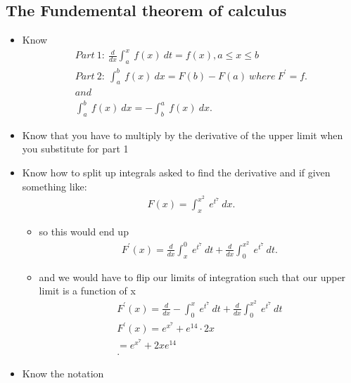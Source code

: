 \documentclass{report}
\begin{document}
      \subsection{The Fundemental theorem of calculus}
      \begin{itemize}
        \item Know
          \begin{align*}
            Part\ 1:\ \frac{d}{dx}\int_{a}^{x}\ f(x)\ dt  = f(x), a \leq x \leq b         \\
            Part\ 2:\ \int_{a}^{b}\ f(x)\ dx = F(b) - F(a)\ where\ F^{\prime} = f. \\
            and \\
            \int_{a}^{b}\ f(x)\ dx = -\int_{b}^{a}\ f(x)\ dx
        .\end{align*}
        \smallbreak \noindent
        \item Know that you have to multiply by the derivative of the upper limit when you substitute for part 1
        \item Know how to split up integrals asked to find the derivative and if given something like:
          \begin{align*}
            F(x) = \int_{x}^{x^{2}}\ e^{t^{7}}\ dx
          .\end{align*}
          \begin{itemize}
            \item so this would end up
              \begin{align*}
                F^{\prime}(x) = \frac{d}{dx}\int_{x}^{0}\ e^{t^{7}}\ dt + \frac{d}{dx}\int_{0}^{x^{2}}\ e^{t^{7}}\ dt
              .\end{align*}
            \item and we would have to flip our limits of integration such that our upper limit is a function of x
              \begin{align*}
                F^{\prime}(x) = \frac{d}{dx}-\int_{0}^{x}\ e^{t^{7}}\ dt + \frac{d}{dx}\int_{0}^{x^{2}}\ e^{t^{7}}\ dt \\
                F^{\prime}(x) = e^{x^{7}} + e^{14} \cdot 2x \\
                 = e^{x^{7}} + 2xe^{14}\\
              .\end{align*}
          \end{itemize}
        \smallbreak \noindent
      \item Know the notation
        \begin{itemize}

\end{itemize}
\end{itemize}
\end{document}
